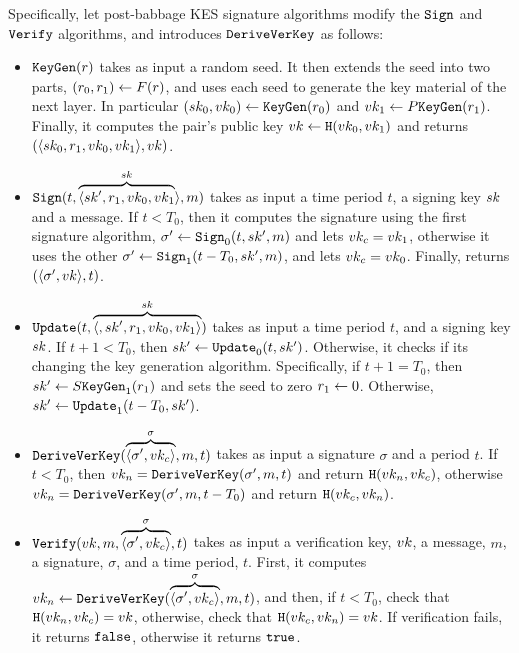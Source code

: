 Specifically, let post-babbage KES signature algorithms modify the $\texttt{Sign}$ and $\texttt{Verify}$ algorithms, and introduces
$\texttt{DeriveVerKey}$ as follows:
\begin{itemize}
    \item $\texttt{KeyGen}(r)$ takes as input a random seed. It then extends the seed into two parts,
    $(r_0, r_1)\gets F(r)$, and uses each seed to generate the key material of the next layer. In
    particular $(sk_0, vk_0)\gets\texttt{KeyGen}(r_0)$ and $vk_1\gets P\texttt{KeyGen}(r_1)$. Finally, it computes
    the pair's public key $vk\gets\texttt{H}(vk_0, vk_1)$ and returns $(\langle sk_0, r_1, vk_0,
    vk_1\rangle, vk)$.
    \item $\texttt{Sign}(t, \overbrace{\langle sk', r_1, vk_0, vk_1}^{sk}\rangle, m)$
    takes as input a time period $t$, a signing key $sk$ and a message. If $t<T_0$, then it computes the
    signature using the first signature algorithm, $\sigma'\gets\texttt{Sign}_0(t, sk', m)$ and lets $vk_c = vk_1$,
    otherwise it uses the other $\sigma'\gets\texttt{Sign}_1(t - T_0, sk', m)$, and lets $vk_c = vk_0$. Finally,
    returns $(\langle\sigma', vk\rangle,t)$.
    \item $\texttt{Update}(t, \overbrace{\langle, sk', r_1, vk_0, vk_1\rangle}^{sk})$ takes as input
    a time period $t$, and a signing key $sk$. If $t+1<T_0$, then $sk'\gets\texttt{Update}_0(t,
    sk')$. Otherwise, it checks if its changing the key
    generation algorithm. Specifically, if $t+1=T_0$, then $sk'\gets S\texttt{KeyGen}_1(r_1)$ and sets the seed
    to zero $r_1\gets 0$. Otherwise, $sk'\gets\texttt{Update}_1(t-T_0, sk')$.
    \item $\texttt{DeriveVerKey}(\overbrace{\langle\sigma', vk_c\rangle}^{\sigma}, m, t)$ takes as input a signature $\sigma$ and a
    period $t$. If $t<T_0$, then $vk_n = \texttt{DeriveVerKey}(\sigma', m, t)$ and return $\texttt{H}(vk_n, vk_c)$, otherwise $vk_n =
    \texttt{DeriveVerKey}(\sigma', m, t - T_0)$ and return $\texttt{H}(vk_c, vk_n)$.
    \item $\texttt{Verify}(vk, m, \overbrace{\langle\sigma', vk_c\rangle}^{\sigma},  t)$ takes as input
    a verification key, $vk$, a message, $m$, a signature, $\sigma$, and a time period, $t$. First, it
    computes $vk_n\gets\texttt{DeriveVerKey}(\overbrace{\langle\sigma', vk_c\rangle}^{\sigma}, m, t)$, and then, if
    $t<T_0$, check that $\texttt{H}(vk_n, vk_c) = vk$, otherwise, check that $\texttt{H}(vk_c, vk_n) = vk$. If verification
    fails, it returns $\texttt{false}$, otherwise it returns $\texttt{true}$.
\end{itemize}

